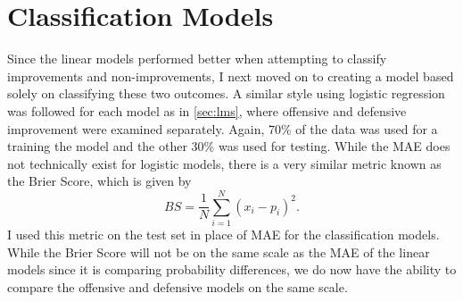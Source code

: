 \documentclass[12pt]{article}
\begin{document}
\begin{table}[t]
\centering
{}
\caption{Defensive Linear Model Evaluators}
\label{tab:dlm-results}
\end{table}


\section{Classification Models}
\label{sec:cms}
Since the linear models performed better when attempting to classify improvements and non-improvements, I next moved on to creating a model based solely on classifying these two outcomes. A similar style using logistic regression was followed for each model as in \autoref{sec:lms}, where offensive and defensive improvement were examined separately. Again, 70\% of the data was used for a training the model and the other 30\% was used for testing. While the MAE does not technically exist for logistic models, there is a very similar metric known as the Brier Score, which is given by 
\begin{equation}
  BS=\frac{1}{N}\sum_{i=1}^{N}(x_{i}-p_{i})^{2}.
\end{equation}
I used this metric on the test set in place of MAE for the classification models. While the Brier Score will not be on the same scale as the MAE of the linear models since it is comparing probability differences, we do now have the ability to compare the offensive and defensive models on the same scale.
\end{document}
